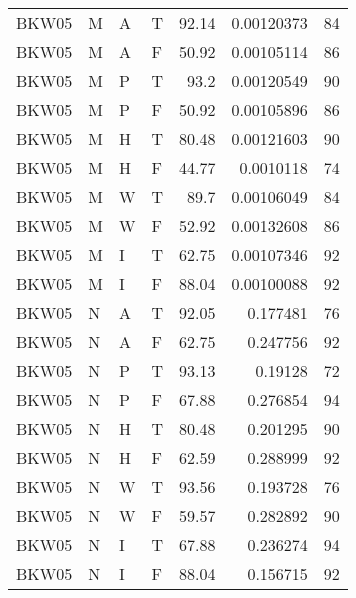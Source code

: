 \begin{tabular}{llllrrr}
    BKW05    & M     & A     & T          & 92.14      & 0.00120373  & 84       \\
    BKW05    & M     & A     & F          & 50.92      & 0.00105114  & 86       \\
    BKW05    & M     & P     & T          & 93.2       & 0.00120549  & 90       \\
    BKW05    & M     & P     & F          & 50.92      & 0.00105896  & 86       \\
    BKW05    & M     & H     & T          & 80.48      & 0.00121603  & 90       \\
    BKW05    & M     & H     & F          & 44.77      & 0.0010118   & 74       \\
    BKW05    & M     & W     & T          & 89.7       & 0.00106049  & 84       \\
    BKW05    & M     & W     & F          & 52.92      & 0.00132608  & 86       \\
    BKW05    & M     & I     & T          & 62.75      & 0.00107346  & 92       \\
    BKW05    & M     & I     & F          & 88.04      & 0.00100088  & 92       \\
    BKW05    & N     & A     & T          & 92.05      & 0.177481    & 76       \\
    BKW05    & N     & A     & F          & 62.75      & 0.247756    & 92       \\
    BKW05    & N     & P     & T          & 93.13      & 0.19128     & 72       \\
    BKW05    & N     & P     & F          & 67.88      & 0.276854    & 94       \\
    BKW05    & N     & H     & T          & 80.48      & 0.201295    & 90       \\
    BKW05    & N     & H     & F          & 62.59      & 0.288999    & 92       \\
    BKW05    & N     & W     & T          & 93.56      & 0.193728    & 76       \\
    BKW05    & N     & W     & F          & 59.57      & 0.282892    & 90       \\
    BKW05    & N     & I     & T          & 67.88      & 0.236274    & 94       \\
    BKW05    & N     & I     & F          & 88.04      & 0.156715    & 92       \\
    \hline
\end{tabular}